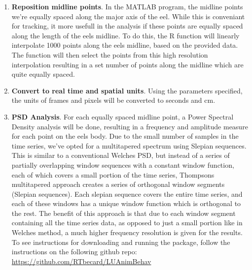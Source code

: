 \documentclass[11pt]{report}
\begin{document}
\begin{enumerate}
	\item \textbf{Reposition midline points}.  In the MATLAB program, the midline points we're equally spaced along the major axis of the eel.
	      While this is conveniant for tracking, it more usefull in the analysis if these points are equally spaced along the length of the eels midline.
	      To do this, the R function will linearly interpolate 1000 points along the eels midline, based on the provided data.
	      The function will then select the points from this high resolution interpolation resulting in a set number of points along the midline which are quite equally spaced.

	\item \textbf{Convert to real time and spatial units}.  Using the parameters specified, the units of frames and pixels will be converted to seconds and cm.

  \item \textbf{PSD Analysis}.  For each equally spaced midline point, a Power Spectral Density analysis will be done, resulting in a frequency and amplitude measure for each point on the eels body.
  Due to the small number of samples in the time series, we've opted for a multitapered spectrum using Slepian sequences.
  This is similar to a conventional Welches PSD, but instead of a series of partially overlapping window sequences with a constant window function, each of which covers a small portion of the time series, Thompsons multitapered approach creates a series of orthogonal window segments (Slepian sequences).
  Each slepian sequence covers the entire time series, and each of these windows has a unique window function which is orthogonal to the rest.
  The benefit of this approach is that due to each window segment containing all the time series data, as opposed to just a small portion like in Welches method, a much higher frequency resolution is given for the results.
  To see instructions for downloading and running the package, follow the instructions on the following github repo: \url{https://github.com/RTbecard/LUAnimBehav}

\end{enumerate}
\end{document}
